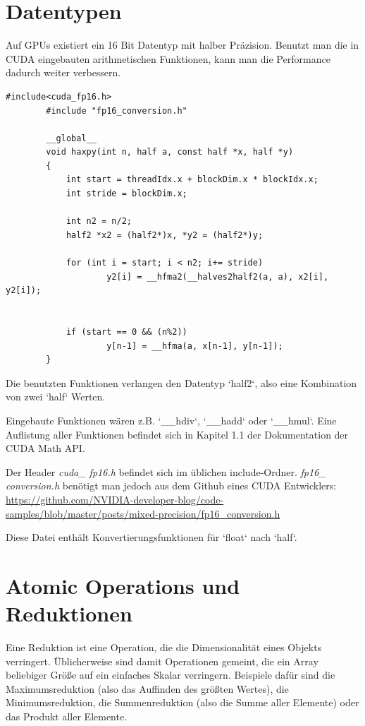 		\section{Datentypen}
		Auf GPUs existiert ein 16 Bit Datentyp mit halber Präzision. Benutzt man die in CUDA eingebauten arithmetischen Funktionen, kann man die Performance dadurch weiter verbessern.			
		\begin{lstlisting}[caption=Half Precision]
		#include<cuda_fp16.h>
		#include "fp16_conversion.h"
		
		__global__
		void haxpy(int n, half a, const half *x, half *y)
		{
    		int start = threadIdx.x + blockDim.x * blockIdx.x;
    		int stride = blockDim.x;

			int n2 = n/2;
			half2 *x2 = (half2*)x, *y2 = (half2*)y;

			for (int i = start; i < n2; i+= stride) 
					y2[i] = __hfma2(__halves2half2(a, a), x2[i], y2[i]);


			if (start == 0 && (n%2))
					y[n-1] = __hfma(a, x[n-1], y[n-1]);
		}
		\end{lstlisting}
		
	    Die benutzten Funktionen verlangen den Datentyp \li`half2`, also eine Kombination von zwei \li`half` Werten.
	    
		Eingebaute Funktionen wären z.B. \li`__hdiv`, \li`__hadd` oder \li`__hmul`. Eine Auflistung aller Funktionen befindet sich in Kapitel 1.1 der Dokumentation der CUDA Math \Gls{API}. \autocite{cudaMath}
		
		Der Header \textit{cuda\_ fp16.h} befindet sich im üblichen include-Ordner. \textit{fp16\_ conversion.h} benötigt man jedoch aus dem Github eines CUDA Entwicklers: \url{https://github.com/NVIDIA-developer-blog/code-samples/blob/master/posts/mixed-precision/fp16_conversion.h}
		
		Diese Datei enthält Konvertierungsfunktionen für \li`float` nach \li`half`.
	
		
		\section{Atomic Operations und Reduktionen}\label{red}
		Eine Reduktion ist eine Operation, die die Dimensionalität eines Objekts verringert. Üblicherweise sind damit Operationen gemeint, die ein Array beliebiger Größe auf ein einfaches Skalar verringern. Beispiele dafür sind die Maximumsreduktion (also das Auffinden des größten Wertes), die Minimumsreduktion, die Summenreduktion (also die Summe aller Elemente) oder das Produkt aller Elemente. 
		
